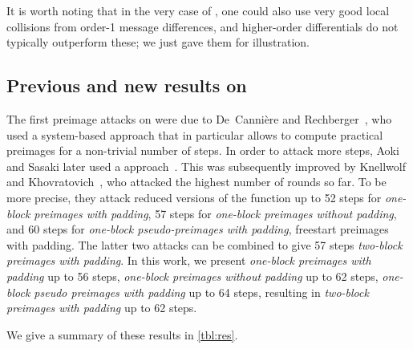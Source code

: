It is worth noting that in the very case of \mdfour, one could also use very
good local collisions from order-1 message differences, and higher-order differentials do not typically outperform these; we just
gave them for illustration.

\subsection{Previous and new results on \shaone}
The first preimage attacks on \shaone were due to De~Canni\`ere and Rechberger~\cite{DBLP:conf/crypto/CanniereR08},
who used a system-based approach that in particular allows to compute practical preimages for a non-trivial
number of steps. In order to attack more steps, Aoki and Sasaki later used a \mitm approach~\cite{AS09}.
This was subsequently improved by Knellwolf and Khovratovich~\cite{DBLP:conf/crypto/KnellwolfK12}, who attacked the highest number
of rounds so far. To be more precise,
they attack reduced versions of the function up to 52 steps for \emph{one-block preimages with padding},
57 steps for \emph{one-block preimages without padding}, and 60 steps for \emph{one-block pseudo-preimages
with padding}, \ie freestart preimages with padding. The latter two attacks can be combined to give 57 steps \emph{two-block preimages with padding}.
In this work, we present \emph{one-block preimages with padding} up to 56 steps,
\emph{one-block preimages without padding} up to 62 steps, \emph{one-block pseudo preimages with padding} up
to 64 steps, resulting in \emph{two-block preimages with padding} up to 62 steps.

We give a summary of these results in \autoref{tbl:res}.


